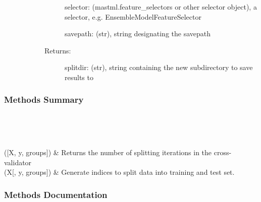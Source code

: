 \documentclass[letterpaper,10pt,english]{sphinxmanual}
\begin{document}
\begin{fulllineitems}
\begin{description}
\begin{description}
\begin{description}
selector: (mastml.feature\_selectors or other selector object), a selector, e.g. EnsembleModelFeatureSelector

savepath: (str), string designating the savepath

\item[{Returns:}] \leavevmode
splitdir: (str), string containing the new subdirectory to save results to

\end{description}

\end{description}

\end{description}
\subsubsection*{Methods Summary}


\begin{savenotes}\sphinxatlongtablestart\begin{longtable}[c]{}
\hline

\endfirsthead

%
{}\\
\hline

\endhead

\hline
{}\\
\endfoot

\endlastfoot

{\hyperref[\detokenize{api/mastml.data_splitters.SklearnDataSplitter:mastml.data_splitters.SklearnDataSplitter.get_n_splits}]{}}({[}X, y, groups{]})
&
Returns the number of splitting iterations in the cross-validator
\\
\hline
{\hyperref[\detokenize{api/mastml.data_splitters.SklearnDataSplitter:mastml.data_splitters.SklearnDataSplitter.split}]{}}(X{[}, y, groups{]})
&
Generate indices to split data into training and test set.
\\
\hline
\end{longtable}\sphinxatlongtableend\end{savenotes}
\subsubsection*{Methods Documentation}


\end{fulllineitems}
\end{document}
